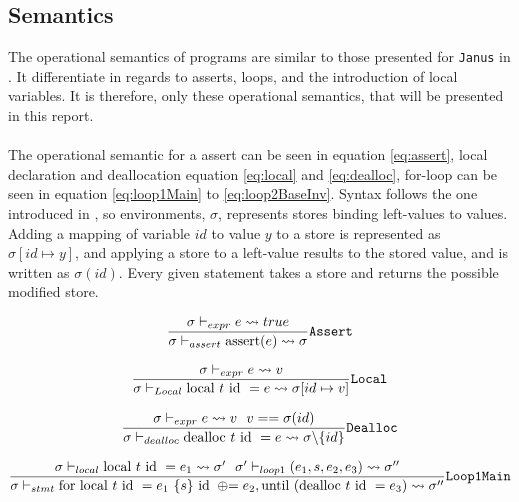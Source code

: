 \subsection{Semantics \ms}
The operational semantics of \lan programs are similar to those presented for \texttt{Janus}
in \cite{janus}. It differentiate in regards to asserts, loops, and the introduction of local
variables. It is therefore, only these operational semantics, that will be presented in this
report.
\\
\\
The operational semantic for a \lan assert can be seen in equation \eqref{eq:assert},
local declaration and deallocation equation \eqref{eq:local} and \eqref{eq:dealloc},
 for-loop can be seen in equation \eqref{eq:loop1Main} to
\eqref{eq:loop2BaseInv}. Syntax follows the one introduced in \cite{pld}, so
environments, $\sigma$, represents stores binding left-values
to values. Adding a mapping of variable $id$ to value $y$ to a store is represented as
$\sigma[id \mapsto y]$, and applying a store to a left-value results to the stored value,
and is written as $\sigma(id)$. Every given statement takes a store and returns the possible
modified store.

\begin{equation} \label{eq:assert}
    \frac{\sigma \vdash_{expr} e \leadsto true}
    {\sigma \vdash_{assert} \text{assert}(e) \leadsto \sigma}
    \text{\texttt{Assert}}
\end{equation}

\begin{equation} \label{eq:local}
    \frac{\sigma \vdash_{expr} e \leadsto v}
    {\sigma \vdash_{Local} \text{local } t \text{ id } = e \leadsto \sigma[id \mapsto v]}
    \text{\texttt{Local}}
\end{equation}

\begin{equation} \label{eq:dealloc}
    \frac{\sigma \vdash_{expr} e \leadsto v ~~
        v == \sigma(id)}
    {\sigma \vdash_{dealloc} \text{dealloc } t \text{ id } = e \leadsto \sigma\backslash \{id\}}
    \text{\texttt{Dealloc}}
\end{equation}

\begin{equation} \label{eq:loop1Main}
    \frac{\sigma \vdash_{local} \text{local } t \text{ id } = e_1 \leadsto \sigma' ~~
        \sigma' \vdash_{loop1} (e_1, s, e_2, e_3) \leadsto \sigma''}
    {\sigma \vdash_{stmt} \text{for local }t\text{ id }= e_1 ~\{s\}\text{ id }\oplus{\kern-5.0pt}= e_2, \text{until (dealloc } t\text{ id }= e_3) \leadsto \sigma''}
    \text{\texttt{Loop1Main}}
\end{equation}

